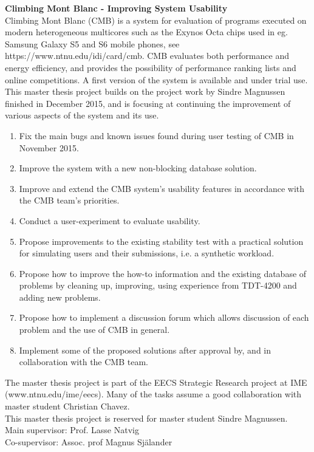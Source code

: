 \textbf{Climbing Mont Blanc - Improving System Usability} \\

Climbing Mont Blanc (CMB) is a system for evaluation of programs executed on modern heterogeneous multicores such as the Exynos Octa chips used in eg. Samsung Galaxy S5 and S6 mobile phones, see https://www.ntnu.edu/idi/card/cmb. CMB evaluates both performance and energy efficiency, and provides the possibility of performance ranking lists and online competitions. A first version of the system is available and under trial use. This master thesis project builds on the project work by Sindre Magnussen finished in December 2015, and is focusing  at continuing the improvement of various aspects of the system and its use. \\

\begin{enumerate}
\item Fix the main bugs and known issues found during user testing of CMB in November 2015.

\item Improve the system with a new non-blocking database solution.

\item Improve and extend the CMB system's usability features in accordance with the CMB team's priorities.

\item  Conduct a user-experiment to evaluate usability.

\item Propose improvements to the existing stability test with a practical solution for simulating users and their submissions, i.e. a synthetic workload.

\item Propose how to improve the how-to information and the existing database of problems by cleaning up, improving, using experience from TDT-4200 and adding new problems.

\item Propose how to implement a discussion forum which allows discussion of each problem and the use of CMB in general.

\item Implement some of the proposed solutions after approval by, and in collaboration with the CMB team.

\end{enumerate}

The master thesis project is part of the EECS Strategic Research project at IME (www.ntnu.edu/ime/eecs). Many of the tasks assume a good collaboration with master student Christian Chavez. \\

This master thesis project is reserved for master student Sindre Magnussen. \\

Main supervisor: Prof. Lasse Natvig \\
Co-supervisor: Assoc. prof Magnus Själander

